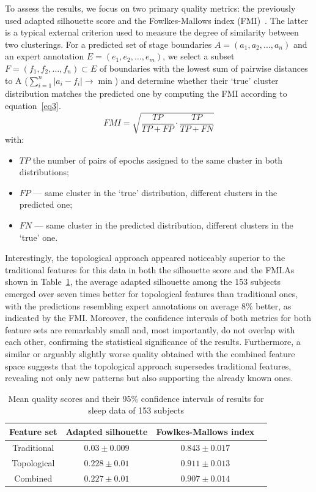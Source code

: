 \documentclass[pdflatex,sn-basic,Numbered]{sn-jnl}
\begin{document}
To assess the results, we focus on two primary quality metrics: the previously used adapted silhouette score and the Fowlkes-Mallows index (FMI)~\cite{Fowlkes01091983}. The latter is a typical external criterion used to measure the degree of similarity between two clusterings. For a predicted set of stage boundaries $A = (a_1, a_2, \dots, a_n)$ and an expert annotation $E = (e_1, e_2, \dots, e_m)$, we select a subset $F = (f_1, f_2, \dots, f_n) \subset E$ of boundaries with the lowest sum of pairwise distances to A ($\sum_{i = 1}^{n} |a_i - f_i| \rightarrow \min$) and determine whether their `true' cluster distribution matches the predicted one by computing the FMI according to equation~\eqref{eq3}.
\begin{equation}
    FMI = \sqrt{\frac{TP}{TP + FP} \cdot \frac{TP}{TP + FN}} \label{eq3}
\end{equation}
with:
\begin{itemize}
    \item
        $TP$ the number of pairs of epochs assigned to the same cluster in both distributions;
    \item
        $FP$ --- same cluster in the `true' distribution, different clusters in the predicted one;
    \item
        $FN$ --- same cluster in the predicted distribution, different clusters in the `true' one.
\end{itemize}

Interestingly, the topological approach appeared noticeably superior to the traditional features for this data in both the silhouette score and the FMI.\@ As shown in Table~\ref{table1}, the average adapted silhouette among the 153 subjects emerged over seven times better for topological features than traditional ones, with the predictions resembling expert annotations on average 8\% better, as indicated by the FMI. Moreover, the confidence intervals of both metrics for both feature sets are remarkably small and, most importantly, do not overlap with each other, confirming the statistical significance of the results. Furthermore, a similar or arguably slightly worse quality obtained with the combined feature space suggests that the topological approach supersedes traditional features, revealing not only new patterns but also supporting the already known ones.


\begin{table}
\caption{Mean quality scores and their 95\% confidence intervals of results for sleep data of 153 subjects}
\label{table1}
\begin{tabular}{cccc}
  \toprule
    Feature set & Adapted silhouette & Fowlkes-Mallows index \\
  \midrule
    Traditional & $0.03 \pm 0.009$  & $0.843 \pm 0.017$ \\
    Topological & $0.228 \pm 0.01 $ & $0.911 \pm 0.013$ \\
    Combined &  $0.227 \pm 0.01 $ & $0.907 \pm 0.014$ \\
  \bottomrule
\end{tabular}
\end{table}
\end{document}
